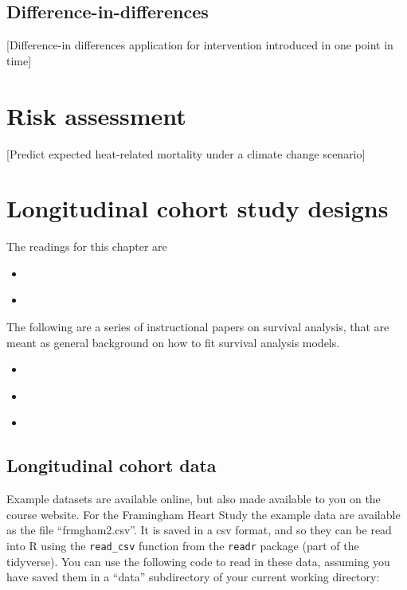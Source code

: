 \documentclass[
]{book}
\begin{document}
\hypertarget{difference-in-differences}{%
\section{Difference-in-differences}\label{difference-in-differences}}

{[}Difference-in differences application for intervention introduced in one point in time{]}

\hypertarget{risk-assessment}{%
\chapter{Risk assessment}\label{risk-assessment}}

{[}Predict expected heat-related mortality under a climate change scenario{]}

\hypertarget{longitudinal-cohort-study-designs}{%
\chapter{Longitudinal cohort study designs}\label{longitudinal-cohort-study-designs}}

The readings for this chapter are

\begin{itemize}
\item
  \citet{andersson201970}
\item
  \citet{wong1989risk}
\end{itemize}

The following are a series of instructional papers on survival analysis, that are
meant as general background on how to fit survival analysis models.

\begin{itemize}
\item
  \citet{clark2003survival}
\item
  \citet{bradburn2003survival}
\item
  \citet{bradburn2003survival2}
\end{itemize}

\hypertarget{longitudinal-cohort-data}{%
\section{Longitudinal cohort data}\label{longitudinal-cohort-data}}

Example datasets are available online, but also made available to you on the course
website. For the Framingham Heart Study the example data are available as the file
``frmgham2.csv''. It is saved in a csv format, and so they can be read into R using the
\texttt{read\_csv} function from the \texttt{readr} package (part of the tidyverse). You can use the following code to read in these data, assuming you have saved them in a ``data'' subdirectory of your current
working directory:
\end{document}

